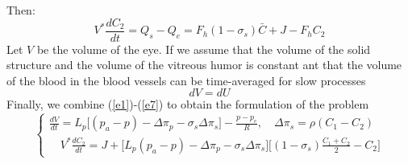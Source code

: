 \documentclass[english,12pt]{article}
\begin{document}
Then:
\begin{equation}
V^{\ast} \frac{dC_{2}}{dt}= Q_s-Q_e=F_h (1-\sigma_s) \bar{C}+J-F_h C_2
\label{e6}
\end{equation}
Let $V$ be the volume of the eye. If we assume that the volume of the solid structure and the volume of the vitreous humor is constant ant that the volume of the blood in the blood vessels can be time-averaged for slow processes
\begin{equation}
dV = dU
\label{e7}
\end{equation}
Finally, we combine (\ref{e1})-(\ref{e7}) to obtain the formulation of the problem
\begin{equation}\label{e8}
\left\{\begin{array}{ll}
\displaystyle{\frac{dV}{dt}}= L_p \big[ (p_a-p)-\Delta\pi_{p}-\sigma_{s} \Delta\pi_{s}\big]-\frac{p-p_{e}}{R},\quad \Delta\pi_{s}=\rho(C_1-C_{2})\\
\quad V^{\ast} \displaystyle{\frac{dC_{2}}{dt}}=J+\big[ L_p (p_a-p)- \Delta\pi_{p}-\sigma_{s} \Delta\pi_{s}\big] \big[(1-\sigma_s)\displaystyle{\frac{C_1+C_2}{2}-C_2\big]}
\end{array}\right.
\end{equation}
\end{document}
